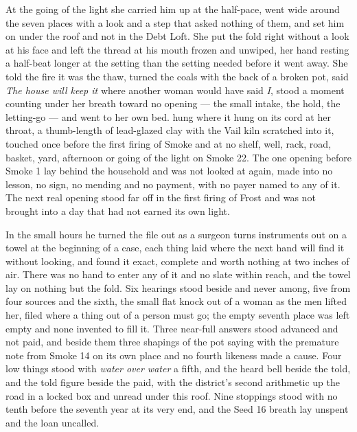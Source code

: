 At the going of the light she carried him up at the half-pace, went wide around the seven places with a look and a step that asked nothing of them, and set him on  under the roof and not in the Debt Loft. She put the fold right without a look at his face and left the thread at his mouth frozen and unwiped, her hand resting a half-beat longer at the setting than the setting needed before it went away. She told the fire it was the thaw, turned the coals with the back of a broken pot, said \emph{The house will keep it} where another woman would have said \emph{I}, stood a moment counting under her breath toward no opening --- the small intake, the hold, the letting-go --- and went to her own bed.  hung where it hung on its cord at her throat, a thumb-length of lead-glazed clay with the Vail kiln scratched into it, touched once before the first firing of Smoke and at no shelf, well, rack, road, basket, yard, afternoon or going of the light on Smoke 22. The one opening before Smoke 1 lay behind the household and was not looked at again, made into no lesson, no sign, no mending and no payment, with no payer named to any of it. The next real opening stood far off in the first firing of Frost and was not brought into a day that had not earned its own light.

In the small hours he turned the file out as a surgeon turns instruments out on a towel at the beginning of a case, each thing laid where the next hand will find it without looking, and found it exact, complete and worth nothing at two inches of air. There was no hand to enter any of it and no slate within reach, and the towel lay on nothing but the fold. Six hearings stood beside and never among, five from four sources and the sixth, the small flat knock out of a woman as the men lifted her, filed where a thing out of a person must go; the empty seventh place was left empty and none invented to fill it. Three near-full answers stood advanced and not paid, and beside them three shapings of the pot saying with the premature note from Smoke 14 on its own place and no fourth likeness made a cause. Four low things stood with \emph{water over water} a fifth, and the heard bell beside the told, and the told figure beside the paid, with the district's second arithmetic up the road in a locked box and unread under this roof. Nine stoppings stood with no tenth before the seventh year at its very end, and the Seed 16 breath lay unspent and the loan uncalled.

